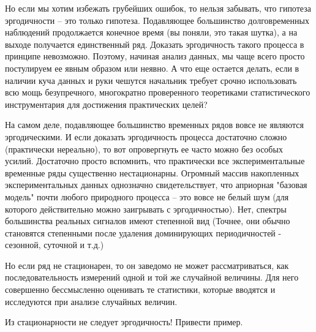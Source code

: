 Но если мы хотим избежать грубейших ошибок, то нельзя забывать, что
гипотеза эргодичности – это только гипотеза. Подавляющее
большинство долговременных наблюдений продолжается конечное время
(вы поняли, это такая шутка), а на выходе получается единственный
ряд. Доказать эргодичность такого процесса в принципе невозможно.
Поэтому, начиная анализ данных, мы чаще всего просто постулируем ее
явным образом или неявно. А что еще остается делать, если в наличии
куча данных и руки чешутся начальник требует срочно использовать
всю мощь безупречного, многократно проверенного теоретиками
статистического инструментария для достижения практических целей?

На самом деле, подавляющее большинство временных рядов вовсе
не являются эргодическими. И если доказать эргодичность процесса
достаточно сложно (практически нереально), то вот
опровергнуть ее часто можно без особых усилий. Достаточно просто
вспомнить, что практически все экспериментальные временные ряды
существенно нестационарны. Огромный массив накопленных
экспериментальных данных однозначно свидетельствует, что априорная
"базовая модель" почти любого природного процесса – это вовсе не
белый шум (для которого действительно можно заигрывать с
эргодичностью). Нет, спектры большинства реальных сигналов имеют
степенной вид (Точнее, они обычно становятся степенными после
удаления доминирующих периодичностей - сезонной, суточной и т.д.)

Но если ряд не стационарен, то он заведомо не может
рассматриваться, как последовательность измерений одной и той же
случайной величины. Для него совершенно бессмысленно оценивать те
статистики, которые вводятся и исследуются при анализе случайных величин.

Из стационарности не следует эргодичность! Привести пример.

\printbibliography[heading=subbibliography, title={Источники}]
